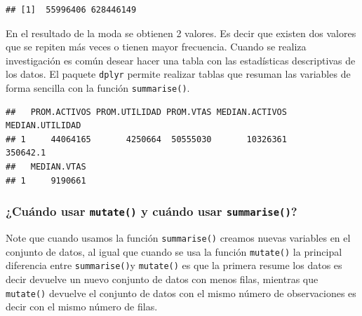 \documentclass[]{book}
\newenvironment{Shaded}{\begin{snugshade}}{\end{snugshade}}
\newcommand{\DataTypeTok}[1]{\textcolor[rgb]{0.13,0.29,0.53}{#1}}
\newcommand{\KeywordTok}[1]{\textcolor[rgb]{0.13,0.29,0.53}{\textbf{#1}}}
\newcommand{\NormalTok}[1]{#1}
\newcommand{\OperatorTok}[1]{\textcolor[rgb]{0.81,0.36,0.00}{\textbf{#1}}}
\newcommand{\StringTok}[1]{\textcolor[rgb]{0.31,0.60,0.02}{#1}}
\begin{document}
\begin{verbatim}
## [1]  55996406 628446149
\end{verbatim}

En el resultado de la moda se obtienen 2 valores. Es decir que existen dos valores que se repiten más veces o tienen mayor frecuencia. Cuando se realiza investigación es común desear hacer una tabla con las estadísticas descriptivas de los datos. El paquete \texttt{dplyr} permite realizar tablas que resuman las variables de forma sencilla con la función \texttt{summarise()}.

\begin{Shaded}
\end{Shaded}

\begin{verbatim}
##   PROM.ACTIVOS PROM.UTILIDAD PROM.VTAS MEDIAN.ACTIVOS MEDIAN.UTILIDAD
## 1     44064165       4250664  50555030       10326361        350642.1
##   MEDIAN.VTAS
## 1     9190661
\end{verbatim}

\hypertarget{cuando-usar-mutate-y-cuando-usar-summarise}{%
\subsubsection{\texorpdfstring{¿Cuándo usar \texttt{mutate()} y cuándo usar \texttt{summarise()}?}{¿Cuándo usar mutate() y cuándo usar summarise()?}}\label{cuando-usar-mutate-y-cuando-usar-summarise}}

Note que cuando usamos la función \texttt{summarise()} creamos nuevas variables en el conjunto de datos, al igual que cuando se usa la función \texttt{mutate()} la principal diferencia entre \texttt{summarise()}y \texttt{mutate()} es que la primera resume los datos es decir devuelve un nuevo conjunto de datos con menos filas, mientras que \texttt{mutate()} devuelve el conjunto de datos con el mismo número de observaciones es decir con el mismo número de filas.
\end{document}
